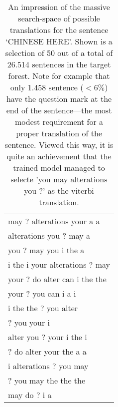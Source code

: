 \documentclass[11pt, a4paper]{article}
\begin{document}
\begin{table}
{\begin{tabular}{ |l| }
may ? alterations your a a \\
alterations you ? may a  \\
you ? may you i the a \\
i the i your alterations ? may \\
your ? do alter can i the the \\
your ? you can i a i \\
i the the ? you alter \\
? you your i \\
alter you ? your i the i \\
? do alter your the a a \\
i  alterations ? you may \\
? you may the the the \\
may do ? i a \\
\hline
\end{tabular}}
\caption{An impression of the massive search-space of possible translations for the sentence `CHINESE HERE'. Shown is a selection of 50 out of a total of 26.514 sentences in the target forest. Note for example that only 1.458 sentence ($<6\%$) have the question mark at the end of the sentence---the most modest requirement for a proper translation of the sentence. Viewed this way, it is quite an achievement that the trained model managed to selecte 'you may alterations you ?' as the viterbi translation.}
\label{table:derrivations}
\end{table}

\end{document}
